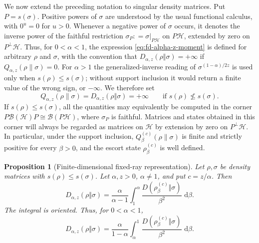 \documentclass[12pt]{article}
\numberwithin{equation}{section}
\newtheorem{proposition}[theorem]{Proposition}
\theoremstyle{definition}
\theoremstyle{remark}
\newcommand{\dd}{\,\mathrm d}
\newcommand{\?}{\overset{?}{=}}
\newcommand{\defeq}{\mathrel{\mathop:}=}
\newcommand{\cH}{\mathcal{H}}
\begin{document}
We now extend the preceding notation to singular density matrices.  Put
$P=s(\sigma)$.  Positive powers of $\sigma$ are understood by the usual
functional calculus, with $0^u=0$ for $u>0$.  Whenever a negative power
of $\sigma$ occurs, it denotes the inverse power of the faithful
restriction $\sigma_P\defeq\sigma\vert_{P\cH}$ on $P\cH$, extended by
zero on $P^\perp\cH$.  Thus, for $0<\alpha<1$, the expression
\eqref{eq:fd-alpha-z-moment} is defined for arbitrary $\rho$ and
$\sigma$, with the convention that
$D_{\alpha,z}(\rho\Vert\sigma)=+\infty$ if
$Q_{\alpha,z}(\rho\|\sigma)=0$.  For $\alpha>1$ the generalized-inverse reading of $\sigma^{(1-\alpha)/2z}$ is used only
when $s(\rho)\le s(\sigma)$; without support inclusion it would return a finite value of
the wrong sign, or $-\infty$. We therefore set
\[
  Q_{\alpha,z}(\rho\|\sigma)
  =D_{\alpha,z}(\rho\Vert\sigma)
  =+\infty
  \qquad\text{if }s(\rho)\not\leq s(\sigma).
\]
If $s(\rho)\leq s(\sigma)$, all the quantities may equivalently be
computed in the corner $P\mathcal B(\cH)P\cong\mathcal B(P\cH)$, where
$\sigma_P$ is faithful.  Matrices and states obtained in this corner
will always be regarded as matrices on $\cH$ by extension by zero on
$P^\perp\cH$.  In particular, under the support inclusion,
$Q_{\beta}^{(c)}(\rho\|\sigma)$ is finite and strictly positive for
every $\beta>0$, and the escort state
$\rho_\beta^{(c)}$ is well defined.




\begin{proposition}[Finite-dimensional fixed-ray representation]
\label{prop:fd-fixed-ray}
Let $\rho,\sigma$ be density matrices with
$s(\rho)\leq s(\sigma)$.  Let $\alpha,z>0$, $\alpha\ne1$, and put
$c=z/\alpha$.
Then
\begin{equation}
  D_{\alpha,z}(\rho\Vert\sigma)
  =\frac{\alpha}{\alpha-1}
   \int_1^\alpha
   \frac{D(\rho_{\beta}^{(c)}\Vert\sigma)}{\beta^2}
   \,\dd\beta .
  \label{eq:fd-fixed-ray-integral}
\end{equation}
The integral is oriented.  Thus, for $0<\alpha<1$,
\begin{equation}
  D_{\alpha,z}(\rho\Vert\sigma)
  =\frac{\alpha}{1-\alpha}
   \int_\alpha^1
   \frac{D(\rho_{\beta}^{(c)}\Vert\sigma)}{\beta^2}
   \,\dd\beta .
  \label{eq:fd-fixed-ray-lower}
\end{equation}
\end{proposition}
\end{document}
